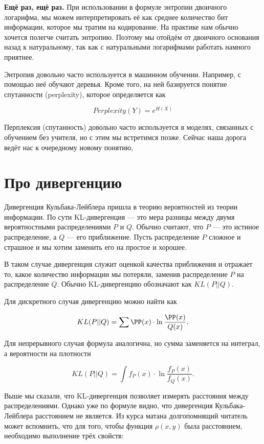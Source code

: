 
\textbf{Ещё раз, ещё раз.} При использовании в формуле энтропии двоичного логарифма, мы можем интерпретировать её как среднее количество бит информации, которое мы  тратим на кодирование. На практике нам обычно хочется полегче считать энтропию. Поэтому мы отойдём от двоичного основания назад к натуральному, так как с натуральными логарифмами работать намного приятнее. 

Энтропия довольно часто используется в машинном обучении. Например, с помощью неё обучают деревья.  Кроме того, на ней базируется понятие спутанности (perplexity), которое определяется как 

\[ Perplexity(Y) = e^{H(X)}\]

Перплексия (спутанность) довольно часто используется в моделях, связанных с обучением без учителя, но с этим мы встретимся позже. Сейчас наша дорога ведёт нас к очередному новому понятию, 


\section{Про дивергенцию} 

Дивергенция Кульбака-Лейблера пришла в теорию вероятностей из теории информации. По сути KL-дивергенция --- это мера разницы между двумя вероятностными распределениями $P$ и $Q$.  Обычно считают, что $P$ --- это истиное распределение, а $Q$ --- его приближение.  Пусть распределение $P$ сложное и страшное и мы хотим заменить его на простое и хорошее. 



В таком случае дивергенция служит оценкой качества приближения и отражает то, какое количество информации мы потеряли, заменив распределение $P$ на распределение $Q$.  Обычно KL-дивергенцию обозначают как $KL(P || Q)$. 

Для дискретного случая дивергенцию можно найти как 

\[ KL(P || Q) = \sum  \PP(x) \cdot \ln \frac{ \PP(x)}{Q(x)}. \]

Для непрерывного случая формула аналогична, но сумма заменяется на интеграл, а вероятности на плотности


\[ KL(P || Q) = \int f_P(x) \cdot \ln \frac{ f_P(x)}{f_Q(x)}. \]

Выше мы сказали, что KL-дивергенция позволяет измерять расстояния между распределениями. Однако уже по формуле видно, что дивергенция Кульбака-Лейблера расстоянием не является.  Из курса матана долгопомнящий читатель может вспомнить, что для того, чтобы функция $\rho(x,y)$ была расстоянием, необходимо выполнение трёх свойств: 

